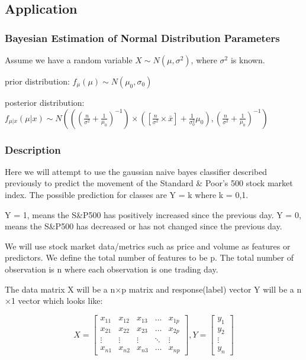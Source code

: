 \documentclass{article}
\begin{document}
\newpage
\subsection{Application}

\subsubsection{Bayesian Estimation of Normal Distribution Parameters}

Assume we have a random variable $X \sim N(\mu ,\sigma ^2)$, where $\sigma^2$ is known.

prior distribution: $f_\mu(\mu) \sim N(\mu_0,\sigma_0)$

posterior distribution: $f_{\mu|x} (\mu|x ) \sim N(((\frac{n}{\sigma^2} + \frac{1}{\mu_0})^{-1}) \times ([\frac{n}{\sigma^2}\times \bar{x}] + \frac{1}{\sigma_{0}^2}\mu_0 ),(\frac{n}{\sigma^2} + \frac{1}{\mu_0})^{-1})$




\subsubsection{Description}
Here we will attempt to use the gaussian naive bayes classifier described previously to predict the movement of the Standard \& Poor's 500 stock market index. The possible prediction for classes are Y = k where k = 0,1.\newline

\noindent Y = 1, means the S\&P500 has positively increased since the previous day.\newline
Y = 0, means the S\&P500 has decreased or has not changed since the previous day.\newline

We will use stock market data/metrics such as price and volume as features or predictors. We define the total number of features to be p. The total number of observation is n where each observation is one trading day.\newline

The data matrix X will be a n$\times$p matrix and response(label) vector Y will be a n$\times$1 vector which looks like:

\[
X = 
\begin{bmatrix}
    x_{11} & x_{12} & x_{13} & \dots  & x_{1p} \\
    x_{21} & x_{22} & x_{23} & \dots  & x_{2p} \\
    \vdots & \vdots & \vdots & \ddots & \vdots \\
    x_{n1} & x_{n2} & x_{n3} & \dots  & x_{np}
\end{bmatrix}
,
Y = 
\begin{bmatrix}
    y_{1} \\
    y_{2} \\
    \vdots\\
    y_{n} 
\end{bmatrix}
\]
\end{document}
